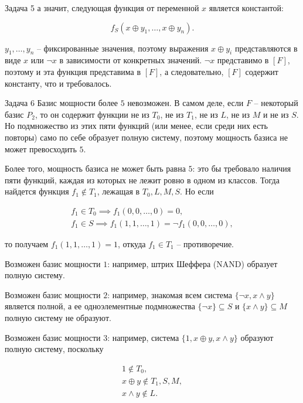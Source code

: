 \documentclass{article}
\begin{document}
\begin{section}{Задача 5}
		а значит, следующая функция от переменной $x$ является константой:

		\begin{equation*}
			f_S(x \oplus y_1, \dots, x \oplus y_n).
		\end{equation*}

		$y_1, \dots, y_n$ -- фиксированные значения, поэтому выражения $x \oplus y_i$ представляются в виде $x$ или $\neg x$ в зависимости от конкретных значений. $\neg x$ представимо в $[F]$, поэтому и эта функция представима в $[F]$, а следовательно, $[F]$ содержит константу, что и требовалось.
	\end{section}

	\begin{section}{Задача 6}
		Базис мощности более $5$ невозможен. В самом деле, если $F$ -- некоторый базис $P_2$, то он содержит функции не из $T_0$, не из $T_1$, не из $L$, не из $M$ и не из $S$. Но подмножество из этих пяти функций (или менее, если среди них есть повторы) само по себе образует полную систему, поэтому мощность базиса не может превосходить $5$.

		Более того, мощность базиса не может быть равна $5$: это бы требовало наличия пяти функций, каждая из которых не лежит ровно в одном из классов. Тогда найдется функция $f_1 \not\in T_1$, лежащая в $T_0, L, M, S$. Но если

		\begin{gather*}
			f_1 \in T_0 \implies f_1(0, 0, \dots, 0) = 0, \\
			f_1 \in S \implies f_1(1, 1, \dots, 1) = \neg f_1(0, 0, \dots, 0),
		\end{gather*}

		то получаем $f_1(1, 1, \dots, 1) = 1$, откуда $f_1 \in T_1$ -- противоречие.

		Возможен базис мощности $1$: например, штрих Шеффера (NAND) образует полную систему.

		Возможен базис мощности $2$: например, знакомая всем система $\{\neg x, x \land y\}$ является полной, а ее одноэлементные подмножества $\{\neg x\} \subseteq S$ и $\{x \land y\} \subseteq M$ полную систему не образуют.

		Возможен базис мощности $3$: например, система $\{1, x \oplus y, x \land y\}$ образуют полную систему, поскольку

		\begin{gather*}
			1 \not\in T_0, \\
			x \oplus y \not\in T_1, S, M, \\
			x \land y \not\in L.
		\end{gather*}


\end{section}
\end{document}
